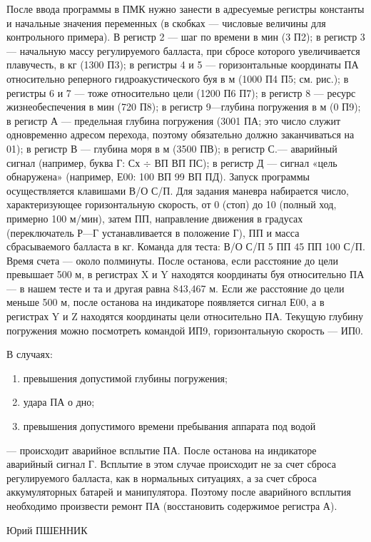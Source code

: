 \documentclass[11pt,a4paper,oneside]{article}
\begin{document}
После ввода программы в ПМК нужно занести в адресуемые регистры константы и начальные значения переменных (в скобках — числовые величины для контрольного примера). В регистр 2 — шаг по времени в мин (3 П2); в регистр 3 — начальную массу регулируемого балласта, при сбросе которого увеличивается плавучесть, в кг (1300 П3); в регистры 4 и 5 — горизонтальные координаты ПА относительно реперного гидроакустического буя в м (1000 П4 П5; см. рис.); в регистры 6 и 7 — тоже относительно цели (1200 П6 П7); в регистр 8 — ресурс жизнеобеспечения в мин (720 П8); в регистр 9—глубина погружения в м (0 П9); в регистр А — предельная глубина погружения (3001 ПА; это число служит одновременно адресом перехода, поэтому обязательно должно заканчиваться на 01); в регистр В — глубина моря в м (3500 ПВ); в регистр С.— аварийный сигнал (например, буква Г: Сх $\div$ ВП ВП ПС); в регистр Д — сигнал «цель обнаружена» (например, Е00: 100 ВП 99 ВП ПД). Запуск программы осуществляется клавишами В/О С/П. Для задания маневра набирается число, характеризующее горизонтальную скорость, от 0 (стоп) до 10 (полный ход, примерно 100 м/мин), затем ПП, направление движения в градусах (переключатель Р—Г устанавливается в положение Г), ПП и масса сбрасываемого балласта в кг. Команда для теста: В/О С/П 5 ПП 45 ПП 100 С/П. Время счета — около полминуты. После останова, если расстояние до цели превышает 500 м, в регистрах X и Y находятся координаты буя относительно ПА — в нашем тесте и та и другая равна 843,467 м. Если же расстояние до цели меньше 500 м, после останова на индикаторе появляется сигнал Е00, а в регистрах Y и Z находятся координаты цели относительно ПА. Текущую глубину погружения можно посмотреть командой ИП9, горизонтальную скорость — ИП0.

В случаях:
\begin{enumerate}
\item превышения допустимой глубины погружения;
\item удара ПА о дно;
\item превышения допустимого времени пребывания аппарата под водой 
\end{enumerate} — происходит аварийное всплытие ПА. После останова на индикаторе аварийный сигнал Г. Всплытие в этом случае происходит не за счет сброса регулируемого балласта, как в нормальных ситуациях, а за счет сброса аккумуляторных батарей и манипулятора. Поэтому после аварийного всплытия необходимо произвести ремонт ПА (восстановить содержимое регистра А).

Юрий ПШЕННИК
\end{document}
